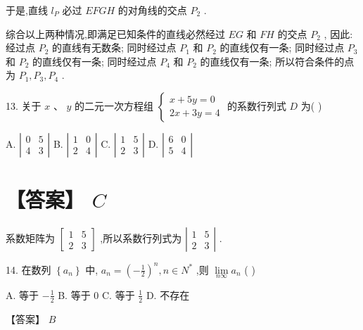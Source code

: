 \documentclass[10pt]{article}
\begin{document}
于是,直线 \({l}_{P}\) 必过 \({EFGH}\) 的对角线的交点 \({P}_{2}\) .

综合以上两种情况,即满足已知条件的直线必然经过 \({EG}\) 和 \({FH}\) 的交点 \({P}_{2}\) , 因此: 经过点 \({P}_{2}\) 的直线有无数条; 同时经过点 \({P}_{1}\) 和 \({P}_{2}\) 的直线仅有一条; 同时经过点 \({P}_{3}\) 和 \({P}_{2}\) 的直线仅有一条; 同时经过点 \({P}_{4}\) 和 \({P}_{2}\) 的直线仅有一条; 所以符合条件的点为 \({P}_{1},{P}_{3},{P}_{4}\) .

13. 关于 \(x\text{ 、 }y\) 的二元一次方程组 \(\left\{  \begin{array}{l} x + {5y} = 0 \\  {2x} + {3y} = 4 \end{array}\right.\) 的系数行列式 \(D\) 为( )

A. \(\left| \begin{array}{ll} 0 & 5 \\  4 & 3 \end{array}\right|\) B. \(\left| \begin{array}{ll} 1 & 0 \\  2 & 4 \end{array}\right|\) C. \(\left| \begin{array}{ll} 1 & 5 \\  2 & 3 \end{array}\right|\) D. \(\left| \begin{array}{ll} 6 & 0 \\  5 & 4 \end{array}\right|\)

\section*{【答案】 \(C\)}

系数矩阵为 \(\left\lbrack  \begin{array}{ll} 1 & 5 \\  2 & 3 \end{array}\right\rbrack\) ,所以系数行列式为 \(\left| \begin{array}{ll} 1 & 5 \\  2 & 3 \end{array}\right|\) .

14. 在数列 \(\left\{  {a}_{n}\right\}\) 中, \({a}_{n} = {\left( -\frac{1}{2}\right) }^{n},n \in  {N}^{ * }\) ,则 \(\mathop{\lim }\limits_{{n\infty }}{a}_{n}\) (   )

A. 等于 \(- \frac{1}{2}\) B. 等于 0 C. 等于 \(\frac{1}{2}\) D. 不存在

【答案】 \(B\)
\end{document}
